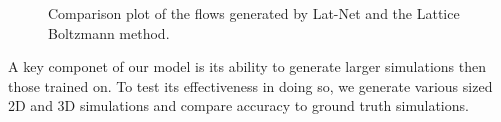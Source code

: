 \documentclass{article}
\begin{document}
\begin{figure}[!t]
\caption{ Comparison plot of the flows generated by Lat-Net and the Lattice Boltzmann method.  }
\label{2d_error_plot}
\end{figure}


A key componet of our model is its ability to generate larger simulations then those trained on. To test its effectiveness in doing so, we generate various sized 2D and 3D simulations and compare accuracy to ground truth simulations.
\end{document}
